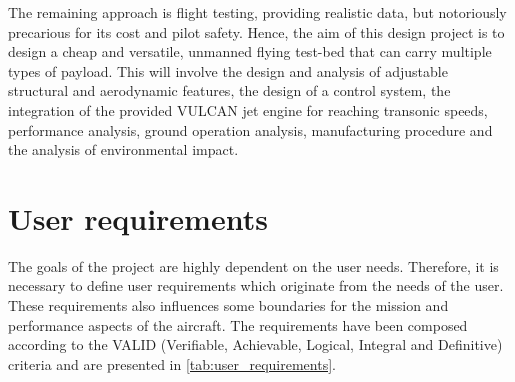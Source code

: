 The remaining approach is flight testing, providing realistic data, but notoriously precarious for its cost and pilot safety. Hence, the aim of this design project is to design a cheap and versatile, unmanned flying test-bed that can carry multiple types of payload. This will involve the design and analysis of adjustable structural and aerodynamic features, the design of a control system, the integration of the provided VULCAN jet engine for reaching transonic speeds, performance analysis, ground operation analysis, manufacturing procedure and the analysis of environmental impact.




\section{User requirements}
The goals of the project are highly dependent on the user needs. Therefore, it is necessary to define user requirements which originate from the needs of the user. These requirements also influences some boundaries for the mission and performance aspects of the aircraft. The requirements have been composed according to the VALID (Verifiable, Achievable, Logical, Integral and Definitive) criteria and are presented in \autoref{tab:user_requirements}.

